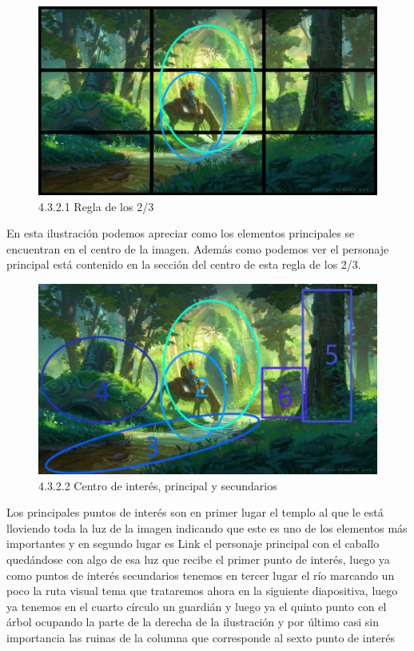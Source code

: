 \documentclass[12pt]{article}
\begin{document}
        
    \begin{figure}[H]
      \centering
      \includegraphics[width=\textwidth]{images/Saúl/Sección 3/EA_img3_2Composicion_1Regla2-3.png}
      \caption{\small 4.3.2.1 Regla de los 2/3}
    \end{figure}

En esta ilustración podemos apreciar como los elementos principales se encuentran en el centro de la imagen. Además como podemos ver el personaje principal está contenido en la sección del centro de esta regla de los 2/3.

    \begin{figure}[H]
      \centering
      \includegraphics[width=\textwidth]{images/Saúl/Sección 3/EA_img3_2Composicion_2PuntosInteres.png}
      \caption{\small 4.3.2.2 Centro de interés, principal y secundarios}
    \end{figure}

Los principales puntos de interés son en primer lugar el templo al que le está lloviendo toda la luz de la imagen indicando que este es uno de los elementos más importantes y en segundo lugar es Link el personaje principal con el caballo quedándose con algo de esa luz que recibe el primer punto de interés, luego ya como puntos de interés secundarios tenemos en tercer lugar el río marcando un poco la ruta visual tema que trataremos ahora en la siguiente diapositiva, luego ya tenemos en el cuarto círculo un guardián y luego ya el quinto punto con el árbol ocupando la parte de la derecha de la ilustración y por último casi sin importancia las ruinas de la columna que corresponde al sexto punto de interés
\end{document}
